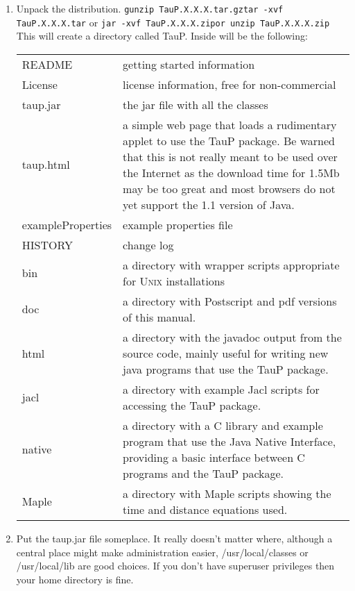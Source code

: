 \begin{enumerate}
\item Unpack the distribution.
\texttt{\newline gunzip TauP.X.X.X.tar.gz\newline tar -xvf TauP.X.X.X.tar\newline}
or
\texttt{\newline jar -xvf TauP.X.X.X.zip\newline or unzip TauP.X.X.X.zip}
This will create a directory called TauP. Inside
will be the following:
\begin{center}
\begin{tabular}{lp{4in}}
README & getting started information \\
License & license information, free for non-commercial \\
taup.jar & the jar file with all the classes \\
taup.html & a simple web page that loads a rudimentary applet to use the TauP
package. Be warned that this is not really meant to be used over the Internet
as the download time for 1.5Mb may be too great and most browsers do not yet
support the 1.1 version of Java. \\
exampleProperties & example properties file \\
HISTORY & change log \\
bin & a directory with wrapper scripts appropriate for 
\textsc{Unix} installations\\
doc & a directory with Postscript and pdf versions of this manual. \\
html & a directory with the javadoc output from
the source code, mainly useful
for writing new java programs that use the TauP package. \\
jacl & a directory with example Jacl scripts for accessing the TauP package. \\
native & a directory with a C library and example program that use the
Java Native Interface, providing a basic interface between C programs
and the TauP package. \\
Maple & a directory with Maple scripts showing the time and distance equations
used.
\end{tabular}
\end{center}

\item Put the taup.jar file someplace. It really doesn't matter where, although
a central place might make administration easier, /usr/local/classes or 
/usr/local/lib are good choices. If you don't have superuser privileges
then your home directory is fine. 


\end{enumerate}
